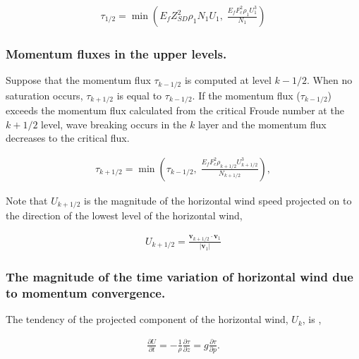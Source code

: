 \begin{eqnarray}
  \tau_{1/2} = \min \left(
                   E_f Z_{SD}^{2} \rho_1 N_1 U_1, \;
                  \frac{E_f F_c^{2} \rho_1 U_1^3}{N_1}
               \right)
\end{eqnarray}

\hypertarget{momentum-fluxes-in-the-upper-levels.}{%
\subsubsection{Momentum fluxes in the upper
levels.}\label{momentum-fluxes-in-the-upper-levels.}}

Suppose that the momentum flux \(\tau_{k-1/2}\) is computed at level
\(k-1/2\). When no saturation occurs, \(\tau_{k+1/2}\) is equal to
\(\tau_{k-1/2}\). If the momentum flux (\(\tau_{k-1/2}\)) exceeds the
momentum flux calculated from the critical Froude number at the
\(k+1/2\) level, wave breaking occurs in the \(k\) layer and the
momentum flux decreases to the critical flux.

\begin{eqnarray}
  \tau_{k+1/2} = \min \left(
               \tau_{k-1/2}, \;
               \frac{E_f F_c^2 \rho_{k+1/2} U_{k+1/2}^3}{N_{k+1/2}}
                      \right),
\end{eqnarray}

Note that \(U_{k+1/2}\) is the magnitude of the horizontal wind speed
projected on to the direction of the lowest level of the horizontal
wind,

\begin{eqnarray}
  U_{k+1/2} = \frac{{\mathbf v}_{k+1/2}
                      \cdot {\mathbf v}_{1}}
                   {|{\mathbf v}_{1}|       }
\end{eqnarray}

\hypertarget{the-magnitude-of-the-time-variation-of-horizontal-wind-due-to-momentum-convergence.}{%
\subsubsection{The magnitude of the time variation of horizontal wind
due to momentum
convergence.}\label{the-magnitude-of-the-time-variation-of-horizontal-wind-due-to-momentum-convergence.}}

The tendency of the projected component of the horizontal wind,
\(U_{k}\), is ,

\begin{eqnarray}
  \frac{\partial U}{\partial t}
        = - \frac{1}{\rho} \frac{\partial \tau}{\partial z}
        = g  \frac{\partial \tau}{\partial p}.
\end{eqnarray}

